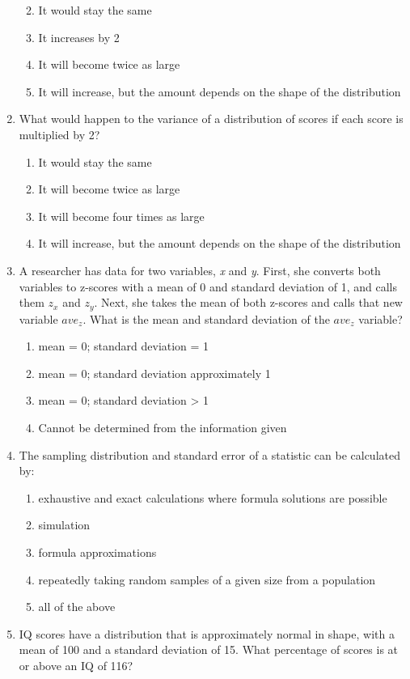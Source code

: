 \documentclass[]{article}
\begin{document}
\begin{enumerate}
  \begin{enumerate}
  \def\labelenumii{\alph{enumii}.}
  \item
    It would stay the same
  \item
    It increases by 2
  \item
    It will become twice as large
  \item
    It will increase, but the amount depends on the shape of the
    distribution
  \end{enumerate}
\item
  What would happen to the variance of a distribution of scores if each
  score is multiplied by 2?

  \begin{enumerate}
  \def\labelenumii{\alph{enumii}.}
  \item
    It would stay the same
  \item
    It will become twice as large
  \item
    It will become four times as large
  \item
    It will increase, but the amount depends on the shape of the
    distribution
  \end{enumerate}
\item
  A researcher has data for two variables, \emph{x} and \emph{y}. First,
  she converts both variables to z-scores with a mean of 0 and standard
  deviation of 1, and calls them \(z_x\) and \(z_y\). Next, she takes
  the mean of both z-scores and calls that new variable \(ave_z\). What
  is the mean and standard deviation of the \(ave_z\) variable?

  \begin{enumerate}
  \def\labelenumii{\alph{enumii}.}
  \item
    mean = 0; standard deviation = 1
  \item
    mean = 0; standard deviation approximately 1
  \item
    mean = 0; standard deviation \textgreater{} 1
  \item
    Cannot be determined from the information given
  \end{enumerate}
\item
  The sampling distribution and standard error of a statistic can be
  calculated by:

  \begin{enumerate}
  \def\labelenumii{\alph{enumii}.}
  \item
    exhaustive and exact calculations where formula solutions are
    possible
  \item
    simulation
  \item
    formula approximations
  \item
    repeatedly taking random samples of a given size from a population
  \item
    all of the above
  \end{enumerate}
\item
  IQ scores have a distribution that is approximately normal in shape,
  with a mean of 100 and a standard deviation of 15. What percentage of
  scores is at or above an IQ of 116?


\end{enumerate}
\end{document}
